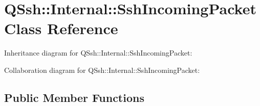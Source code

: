 \hypertarget{class_q_ssh_1_1_internal_1_1_ssh_incoming_packet}{}\section{Q\+Ssh\+:\+:Internal\+:\+:Ssh\+Incoming\+Packet Class Reference}
\label{class_q_ssh_1_1_internal_1_1_ssh_incoming_packet}


Inheritance diagram for Q\+Ssh\+:\+:Internal\+:\+:Ssh\+Incoming\+Packet\+:


Collaboration diagram for Q\+Ssh\+:\+:Internal\+:\+:Ssh\+Incoming\+Packet\+:
\subsection*{Public Member Functions}
